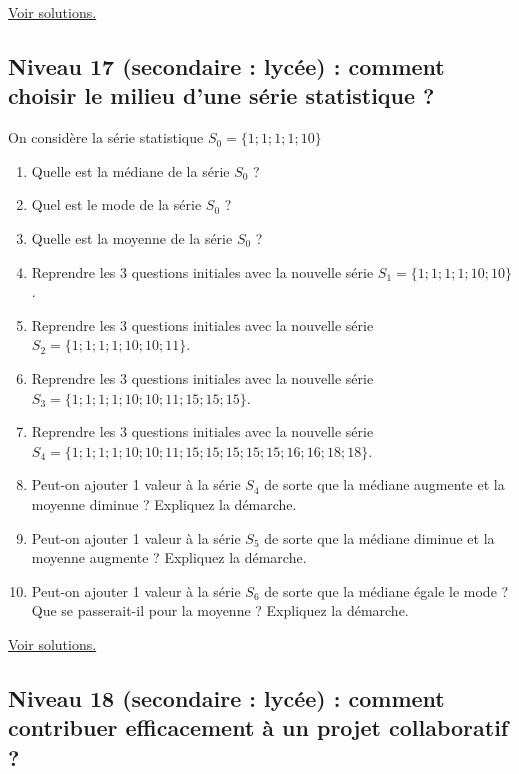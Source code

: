 \documentclass[11pt]{article}
\begin{document}
\hyperref[org05889bb]{Voir solutions.}

\newpage

\subsection{Niveau 17 (secondaire : lycée) : comment choisir le milieu d'une série statistique ?}
\label{sec:org6a8c6c1}

\label{org9efc1a1}

On considère la série statistique \(S_0 = \{1 ; 1 ; 1 ; 1 ; 10\}\)

\begin{enumerate}
\item Quelle est la médiane de  la série \(S_0\) ?
\item Quel est le mode de  la série \(S_0\) ?
\item Quelle est la moyenne de  la série \(S_0\) ?
\item Reprendre les 3 questions initiales avec la nouvelle série \(S_1 =
   \{1 ; 1 ; 1 ; 1 ; 10 ; 10\}\).
\item Reprendre les 3 questions initiales avec la nouvelle série \(S_2 =
   \{1 ; 1 ; 1 ; 1 ; 10 ; 10 ; 11\}\).
\item Reprendre les 3 questions initiales avec la nouvelle série \(S_3 =
   \{1 ; 1 ; 1 ; 1 ; 10 ; 10 ; 11 ; 15 ; 15 ; 15\}\).
\item Reprendre les 3 questions initiales avec la nouvelle série \(S_4 =
   \{1 ; 1 ; 1 ; 1 ; 10 ; 10 ; 11 ; 15 ; 15 ; 15 ; 15 ; 15 ; 16 ; 16 ;
   18 ; 18\}\).
\item Peut-on ajouter 1 valeur à la série \(S_4\) de sorte que la médiane
augmente et la moyenne diminue ? Expliquez la démarche.
\item Peut-on ajouter 1 valeur à la série \(S_5\) de sorte que la médiane
diminue et la moyenne augmente ? Expliquez la démarche.
\item Peut-on ajouter 1 valeur à la série \(S_6\) de sorte que la médiane
égale le mode ? Que se passerait-il pour la moyenne ? Expliquez la
démarche.
\end{enumerate}


\hyperref[org3b54be7]{Voir solutions.}

\newpage

\subsection{Niveau 18 (secondaire : lycée) : comment contribuer efficacement à un projet collaboratif ?}
\label{sec:orgc66b670}
\end{document}
